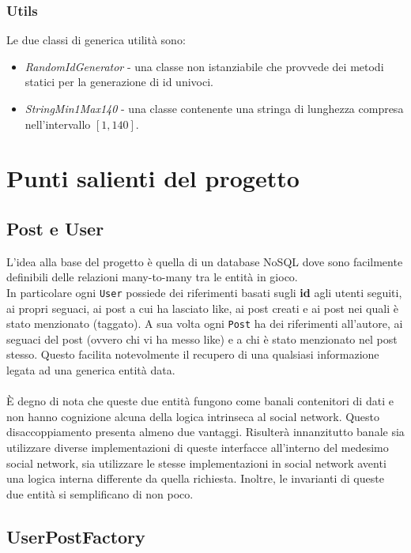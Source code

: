 \documentclass[a4paper,10pt]{article}
\begin{document}
\subsubsection*{Utils}
Le due classi di generica utilità sono:
\begin{itemize}
    \item \emph{RandomIdGenerator} - una classe non istanziabile che provvede dei metodi statici per la generazione di id univoci.
    \item \emph{StringMin1Max140} - una classe contenente una stringa di lunghezza compresa nell'intervallo $[1, 140]$.
\end{itemize}


\newpage

\section*{Punti salienti del progetto}

\subsection*{Post e User}
L'idea alla base del progetto è quella di un database NoSQL dove sono facilmente definibili delle relazioni many-to-many tra le entità in gioco.\\
In particolare ogni \texttt{User} possiede dei riferimenti basati sugli \textbf{id} agli utenti seguiti, ai propri seguaci, ai post a cui ha lasciato like,
ai post creati e ai post nei quali è stato menzionato (taggato). A sua volta ogni \texttt{Post} ha dei riferimenti all'autore, ai seguaci del post (ovvero chi vi ha messo like)
e a chi è stato menzionato nel post stesso. Questo facilita notevolmente il recupero di una qualsiasi informazione legata ad una generica entità data.
\\~\\
È degno di nota che queste due entità fungono come banali contenitori di dati e non hanno cognizione alcuna della logica intrinseca al social network.
Questo disaccoppiamento presenta almeno due vantaggi. Risulterà innanzitutto banale sia utilizzare diverse implementazioni di queste interfacce
all'interno del medesimo social network, sia utilizzare le stesse implementazioni in social network aventi una logica interna differente da quella
richiesta. Inoltre, le invarianti di queste due entità si semplificano di non poco.

\subsection*{UserPostFactory}
\end{document}
